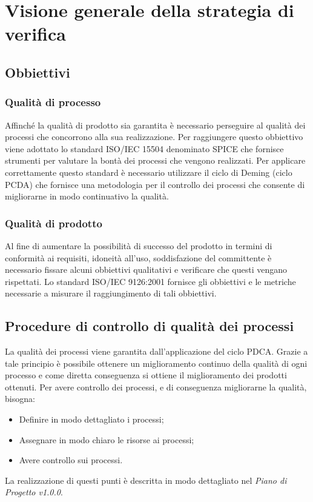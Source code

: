 \chapter{Visione generale della strategia di verifica}
\section{Obbiettivi}
\subsection{Qualità di processo}
Affinché la qualità di prodotto sia garantita è necessario perseguire al qualità dei processi che concorrono alla sua realizzazione. Per raggiungere questo obbiettivo viene adottato lo standard ISO/IEC 15504 denominato SPICE che fornisce strumenti per valutare la bontà dei processi che vengono realizzati.
Per applicare correttamente questo standard è necessario utilizzare il ciclo di Deming (ciclo PCDA) che fornisce una metodologia per il controllo dei processi che consente di migliorarne in modo continuativo la qualità. 
\subsection{Qualità di prodotto}
Al fine di aumentare la possibilità di successo del prodotto in termini di conformità ai requisiti, idoneità all'uso, soddisfazione del committente è necessario fissare alcuni obbiettivi qualitativi e verificare che questi vengano rispettati.
Lo standard ISO/IEC 9126:2001 fornisce gli obbiettivi e le metriche necessarie a misurare il raggiungimento di tali obbiettivi.
\section{Procedure di controllo di qualità dei processi}
La qualità dei processi viene garantita dall'applicazione del ciclo PDCA. Grazie a tale principio è possibile ottenere un miglioramento continuo della qualità di ogni processo e come diretta conseguenza si ottiene il miglioramento dei prodotti ottenuti.
Per avere controllo dei processi, e di conseguenza migliorarne la qualità, bisogna: 
\begin{itemize}
	\item Definire in modo dettagliato i processi;
	\item Assegnare in modo chiaro le risorse ai processi;
	\item Avere controllo sui processi.
\end{itemize} 
La realizzazione di questi punti è descritta in modo dettagliato nel \textit{Piano di Progetto v1.0.0}.
